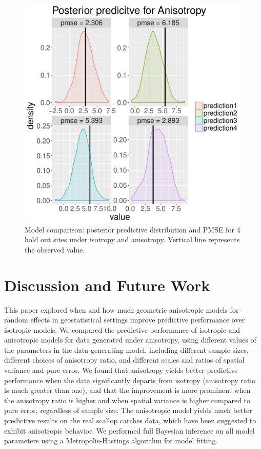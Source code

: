\documentclass[12pt,twoside]{dukestatscithesis}
\theoremstyle{definition}
\theoremstyle{definition}
\theoremstyle{definition}
\theoremstyle{remark}
\begin{document}
\begin{figure}
\includegraphics[scale=0.7]{figure/crps_Aniso} \caption{Model comparison: posterior predictive distribution and PMSE for 4 hold out sites under isotropy and anisotropy. Vertical line represents the observed value.}\label{fig:CRPS1}
\end{figure}
\chapter{Discussion and Future Work}\label{discussion-and-future-work}

This paper explored when and how much geometric anisotropic models for
random effects in geostatistical settings improve predictive performance
over isotropic models. We compared the predictive performance of
isotropic and anisotropic models for data generated under anisotropy,
using different values of the parameters in the data generating model,
including different sample sizes, different choices of anisotropy ratio,
and different scales and ratios of spatial variance and pure error. We
found that anisotropy yields better predictive performance when the data
significantly departs from isotropy (anisotropy ratio is much greater
than one), and that the improvement is more prominent when the
anisotropy ratio is higher and when spatial variance is higher compared
to pure error, regardless of sample size. The anisotropic model yields
much better predictive results on the real scallop catches data, which
have been suggested to exhibit anisotropic behavior. We performed full
Bayesian inference on all model parameters using a Metropolis-Hastings
algorithm for model fitting.
\end{document}
